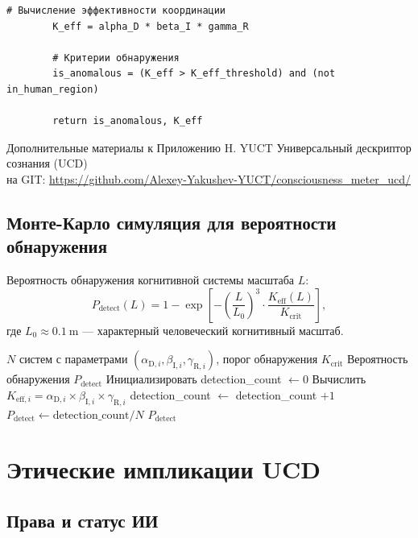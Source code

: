 \documentclass[12pt,a4paper]{article}
\newcommand{\eff}{\mathrm{eff}}
\newcommand{\Ke}{K_{\eff}}
\newcommand{\Kcrit}{K_{\mathrm{crit}}}
\begin{document}
\begin{lstlisting}[caption={Python-код для оценки параметров UCD по временным рядам}, label={lst:ucd-python}]
		# Вычисление эффективности координации
		K_eff = alpha_D * beta_I * gamma_R
		
		# Критерии обнаружения
		is_anomalous = (K_eff > K_eff_threshold) and (not in_human_region)
		
		return is_anomalous, K_eff
	\end{lstlisting}
	
	Дополнительные материалы к Приложению H. YUCT Универсальный дескриптор сознания (UCD) \\ на GIT: \url{https://github.com/Alexey-Yakushev-YUCT/consciousness_meter_ucd/}
	
	\subsection{Монте-Карло симуляция для вероятности обнаружения}
	
	Вероятность обнаружения когнитивной системы масштаба \(L\):
	\[
	P_{\mathrm{detect}}(L) = 1 - \exp\!\left[-\left(\frac{L}{L_0}\right)^3 \cdot \frac{\Ke(L)}{\Kcrit}\right],
	\]
	где \(L_0 \approx 0.1~\mathrm{m}\) — характерный человеческий когнитивный масштаб.
	
	\begin{algorithm}
		\caption{Монте-Карло симуляция обнаружения когнитивной системы}
		\begin{algorithmic}[1]
			\Require \(N\) систем с параметрами \((\alpha_{\mathrm{D},i}, \beta_{\mathrm{I},i}, \gamma_{\mathrm{R},i})\), порог обнаружения \(\Kcrit\)
			\Ensure Вероятность обнаружения \(P_{\mathrm{detect}}\)
			\State Инициализировать detection\_count \(\gets 0\)
			\State Вычислить \(K_{\eff,i} = \alpha_{\mathrm{D},i} \times \beta_{\mathrm{I},i} \times \gamma_{\mathrm{R},i}\)
			\If{\(K_{\eff,i} > \Kcrit\)}
			\State detection\_count \(\gets\) detection\_count \(+ 1\)
			\EndIf
			\EndFor
			\State \(P_{\mathrm{detect}} \gets \text{detection\_count} / N\)
			\Return \(P_{\mathrm{detect}}\)
		\end{algorithmic}
	\end{algorithm}
	
	\section{Этические импликации UCD}
	
	\subsection{Права и статус ИИ}
	
\end{document}
